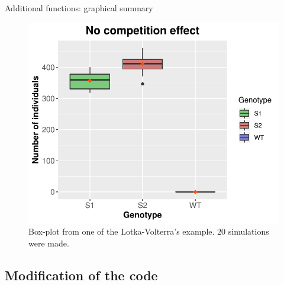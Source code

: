 \begin{frame}{Additional functions: graphical summary}
    \begin{figure}
    \includegraphics[width=0.7\linewidth]{img/boxplot_example.pdf}
    \caption{Box-plot from one of the Lotka-Volterra's example. 20 simulations were made.}
    \end{figure}
\end{frame}

\subsection{Modification of the code}

